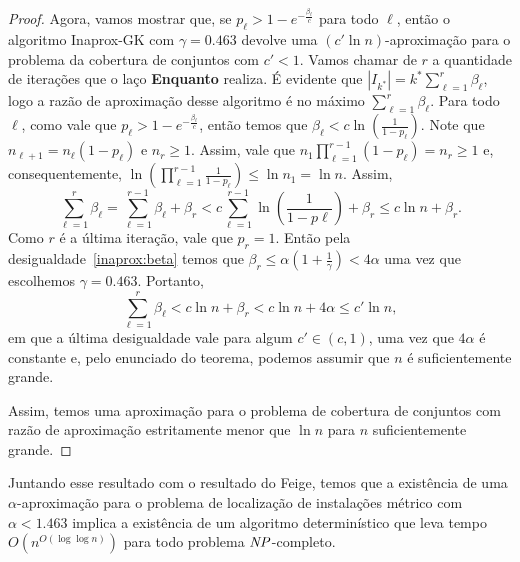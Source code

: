 \begin{proof}
Agora, vamos mostrar que, se $p_\ell > 1 - e^{ - \frac{\beta_\ell}{c}}$ para todo $\ell$, então o algoritmo {\sc Inaprox-GK} com $\gamma = 0.463$ devolve uma $(c'\ln n)$-aproximação para o problema da cobertura de conjuntos com $c' < 1$. Vamos chamar de $r$ a quantidade de iterações que o laço {\bf Enquanto} realiza. É evidente que $|I_{k^*}| = k^*\sum_{\ell = 1}^r \beta_\ell$, logo a razão de aproximação desse algoritmo é no máximo $\sum_{\ell = 1}^r \beta_\ell$. Para todo $\ell$, como vale que $p_\ell > 1 - e^{ - \frac{\beta_\ell}{c}}$, então temos que $\beta_\ell < c \ln\left( \frac{1}{1-p_\ell}\right)$. Note que $n_{\ell + 1} = n_\ell(1-p_\ell)$ e $n_r \geq 1$. Assim, vale que $n_1 \prod_{\ell =1}^{r-1} (1 - p_\ell) = n_r \geq 1$ e, consequentemente, $\ln\left(\prod_{\ell =1 }^{r-1} \frac{1}{1-p_\ell}\right) \leq \ln n_1 = \ln n$. Assim,
\[ \sum_{\ell= 1}^r \beta_\ell = \sum_{\ell =1}^{r-1} \beta_\ell + \beta_r < c\sum_{\ell = 1}^{r-1} \ln \left( \frac{1}{1-p\ell}\right) + \beta_r \leq c \ln n + \beta_r. \]
Como $r$ é a última iteração, vale que $p_r= 1$. Então pela desigualdade~\eqref{inaprox:beta} temos que $\beta_r \leq \alpha(1 + \frac{1}{\gamma}) < 4\alpha$ uma vez que escolhemos $\gamma = 0.463$. Portanto,
\[ \sum_{\ell =1}^r \beta_\ell < c \ln n + \beta_r < c\ln n + 4\alpha \leq c' \ln n, \]
em que a última desigualdade vale para algum $c' \in (c,1)$, uma vez que $4\alpha$ é constante e, pelo enunciado do teorema, podemos assumir que $n$ é suficientemente grande.

Assim, temos uma aproximação para o problema de cobertura de conjuntos com razão de aproximação estritamente menor que $\ln n$ para $n$ suficientemente grande.
\end{proof}

Juntando esse resultado com o resultado do Feige, temos que a existência de uma $\alpha$-aproximação para o problema de localização de instalações métrico com $\alpha < 1.463$ implica a existência de um algoritmo determinístico que leva tempo $O(n^{O(\log \log n)})$ para todo problema $\mathit{NP}$-completo.